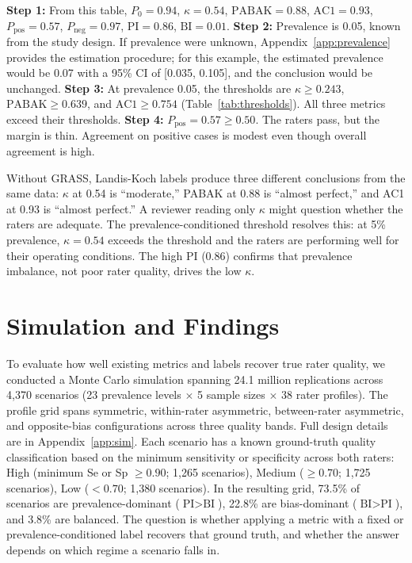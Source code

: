 \documentclass[11pt]{article}
\begin{document}
\noindent \textbf{Step 1:} From this table, $P_0 = 0.94$, $\kappa = 0.54$, $\text{PABAK} = 0.88$, $\text{AC1} = 0.93$, $P_{\text{pos}} = 0.57$, $P_{\text{neg}} = 0.97$, $\text{PI} = 0.86$, $\text{BI} = 0.01$. \textbf{Step 2:} Prevalence is 0.05, known from the study design. If prevalence were unknown, Appendix~\ref{app:prevalence} provides the estimation procedure; for this example, the estimated prevalence would be 0.07 with a 95\% CI of [0.035, 0.105], and the conclusion would be unchanged. \textbf{Step 3:} At prevalence 0.05, the thresholds are $\kappa \geq 0.243$, $\text{PABAK} \geq 0.639$, and $\text{AC1} \geq 0.754$ (Table~\ref{tab:thresholds}). All three metrics exceed their thresholds. \textbf{Step 4:} $P_{\text{pos}} = 0.57 \geq 0.50$. The raters pass, but the margin is thin. Agreement on positive cases is modest even though overall agreement is high.

Without GRASS, Landis-Koch labels produce three different conclusions from the same data: $\kappa$ at 0.54 is ``moderate,'' PABAK at 0.88 is ``almost perfect,'' and AC1 at 0.93 is ``almost perfect.'' A reviewer reading only $\kappa$ might question whether the raters are adequate. The prevalence-conditioned threshold resolves this: at 5\% prevalence, $\kappa = 0.54$ exceeds the threshold and the raters are performing well for their operating conditions. The high PI (0.86) confirms that prevalence imbalance, not poor rater quality, drives the low $\kappa$.

\section*{Simulation and Findings}

To evaluate how well existing metrics and labels recover true rater quality, we conducted a Monte Carlo simulation spanning 24.1 million replications across 4,370 scenarios (23 prevalence levels $\times$ 5 sample sizes $\times$ 38 rater profiles). The profile grid spans symmetric, within-rater asymmetric, between-rater asymmetric, and opposite-bias configurations across three quality bands. Full design details are in Appendix~\ref{app:sim}. Each scenario has a known ground-truth quality classification based on the minimum sensitivity or specificity across both raters: High (minimum Se or Sp $\geq 0.90$; 1,265 scenarios), Medium ($\geq 0.70$; 1,725 scenarios), Low ($< 0.70$; 1,380 scenarios). In the resulting grid, 73.5\% of scenarios are prevalence-dominant ($\text{PI} > \text{BI}$), 22.8\% are bias-dominant ($\text{BI} > \text{PI}$), and 3.8\% are balanced. The question is whether applying a metric with a fixed or prevalence-conditioned label recovers that ground truth, and whether the answer depends on which regime a scenario falls in.
\end{document}
